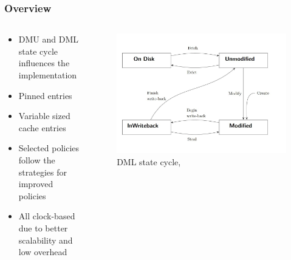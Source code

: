 \documentclass[
	aspectratio=169,
	compress,
]{beamer}
\newcommand{\navframetitle}[1]{\frametitle{#1\hfill{\footnotesize\lastsection{}}}}
\begin{document}
\begin{frame}
	\navframetitle{Overview}

	\begin{columns}
		\begin{column}{0.5\textwidth}
			\begin{itemize}
				\item DMU and DML state cycle influences the implementation
				\item Pinned entries 
				\item Variable sized cache entries	
				\item Selected policies follow the strategies for improved policies
				\item All clock-based due to better scalability and low overhead
			\end{itemize}
		\end{column}
		\begin{column}{0.5\textwidth}
			\begin{figure}[ht]
    			\centering
    			\includegraphics[scale=0.2]{DML_state_cycle.jpg}
    			\caption{DML state cycle, \cite{wiedemann2018modern}}
        		\label{fig:DML state cycle}
			\end{figure}			
		\end{column}
	\end{columns}
\end{frame}
\end{document}
